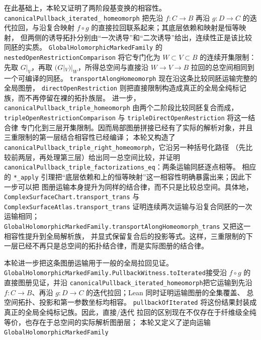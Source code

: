 \documentclass[UTF8,fontset=none,a4paper,11pt]{ctexart}
\begin{document}
在此基础上，本轮又证明了两阶段基变换的相容性。
\texttt{canonicalPullback\_iterated\_} \texttt{homeomorph} 把先沿 \(f:C\to B\) 再沿
\(g:D\to C\) 的迭代拉回，与沿复合映射 \(f\circ g\) 的直接拉回联系起来；其底层依赖和映射是恒等映射，
但两侧的诱导拓扑分别由“一次诱导”和“二次诱导”给出，连续性正是该比较同胚的实质。
\texttt{GlobalHolomorphicMarkedFamily} 的
\texttt{nestedOpenRestrictionComparison} 将它专门化为
\(W\subset V\subset B\) 的连续开集限制：先取 \(G|_V\)，再取 \((G|_V)|_W\)，所得总空间与直接沿
\(W\to V\to B\) 拉回的总空间相同到一个可编译的同胚。
\texttt{transportAlongHomeomorph} 现在沿这条比较同胚运输完整的全局图册，
\texttt{directOpenRestriction} 则把直接限制构造成真正的全局全纯标记族，而不再停留在裸的拓扑族层。
进一步，\texttt{canonicalPullback\_triple\_homeomorph} 由两个二阶段比较同胚复合而成，
\texttt{tripleOpenRestrictionComparison} 与 \texttt{tripleDirectOpenRestriction} 将这一结合律
专门化到三层开集限制。因而局部图册拼接已经有了实际的解析对象，并且三重限制的第一层结合相容性已经编译；
本轮又构造了 \texttt{canonicalPullback\_triple\_right\_homeomorph}，它沿另一种括号化路径
（先比较前两层，再处理第三层）给出同一总空间比较，并证明
\texttt{canonicalPullback\_triple\_factorizations\_eq}：两条运输同胚逐点相等。
相应的 \texttt{*\_apply} 引理把“底层依赖和上的恒等映射”这一相容性明确暴露出来；因此下一步可以把
图册运输本身提升为同样的结合律，而不只是比较总空间。具体地，
\texttt{ComplexSurfaceChart.transport\_trans} 与
\texttt{ComplexSurfaceAtlas.transport\_trans} 证明连续两次运输与沿复合同胚的一次运输相同；
\texttt{GlobalHolomorphicMarkedFamily.transportAlongHomeomorph\_trans} 又把这一相容性提升到全局解析族，
并显式保留复合后的投影等式。这样，三重限制的下一层已经不再只是总空间的拓扑结合律，而是实际图册的结合律。
\par
\newpage
本轮进一步把这条图册运输用于一般的全局拉回见证。
\texttt{GlobalHolomorphicMarkedFamily}\linebreak[3]
\texttt{.PullbackWitness.toIterated}\linebreak[4]
接受沿
\(f\circ g\) 的直接图册见证，并沿
\texttt{canonicalPullback\_iterated\_}\linebreak[3]
\texttt{homeomorph}\linebreak[4]
把它运输到先沿
\(f:C\to B\)、再沿 \(g:D\to C\) 的迭代拉回；Lean 同时证明运输图册的全集覆盖、
总空间拓扑、投影和第一参数坐标均相容。
\texttt{pullbackOfIterated} 将这份结果封装成真正的全局全纯标记族。因此，直接/迭代
拉回的区别现在不仅存在于纤维级全纯等价，也存在于总空间的实际解析图册层；
本轮又定义了逆向运输
\texttt{GlobalHolomorphicMarkedFamily}\linebreak[3]
\end{document}

